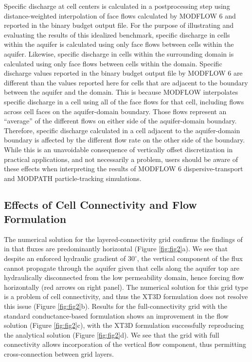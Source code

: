 \documentclass{article}
\begin{document}
Specific discharge at cell centers is calculated in a postprocessing step using distance-weighted interpolation of face flows calculated by MODFLOW 6 and reported in the binary budget output file. For the purpose of illustrating and evaluating the results of this idealized benchmark, specific discharge in cells within the aquifer is calculated using only face flows between cells within the aquifer. Likewise, specific discharge in cells within the surrounding domain is calculated using only face flows between cells within the domain. Specific discharge values reported in the binary budget output file by MODFLOW 6 are different than the values reported here for cells that are adjacent to the boundary between the aquifer and the domain. This is because MODFLOW interpolates specific discharge in a cell using all of the face flows for that cell, including flows across cell faces on the aquifer-domain boundary. Those flows represent an ``average'' of the different flows on either side of the aquifer-domain boundary. Therefore, specific discharge calculated in a cell adjacent to the aquifer-domain boundary is affected by the different flow rate on the other side of the boundary. While this is an unavoidable consequence of vertically offset discretization in practical applications, and not necessarily a problem, users should be aware of these effects when interpreting the results of MODFLOW 6 dispersive-transport and MODPATH particle-tracking simulations.

\subsection{Effects of Cell Connectivity and Flow Formulation}

The numerical solution for the layered-connectivity grid confirms the findings of \cite{bardot2023} in that fluxes are predominantly horizontal (Figure \ref{fig:fig2}a). We see that despite an enforced hydraulic gradient of $30^{\circ}$, the vertical component of the flux cannot propagate through the aquifer given that cells along the aquifer top are hydraulically disconnected from the low permeability domain, hence forcing flow horizontally (red arrows on right panel). The numerical solution for this grid type is a problem of cell connectivity, and thus the XT3D formulation does not resolve this issue (Figure \ref{fig:fig2}b). Results for the full-connectivity grid with the standard conductance-based formulation shows an improvement in the flow solution (Figure \ref{fig:fig2}c), with the XT3D formulation successfully reproducing the analytical solution (Figure \ref{fig:fig2}d). We see that the grid with full connectivity allows incorporation of the vertical flow component, thus permitting cross-connection between grid layers.
\end{document}

